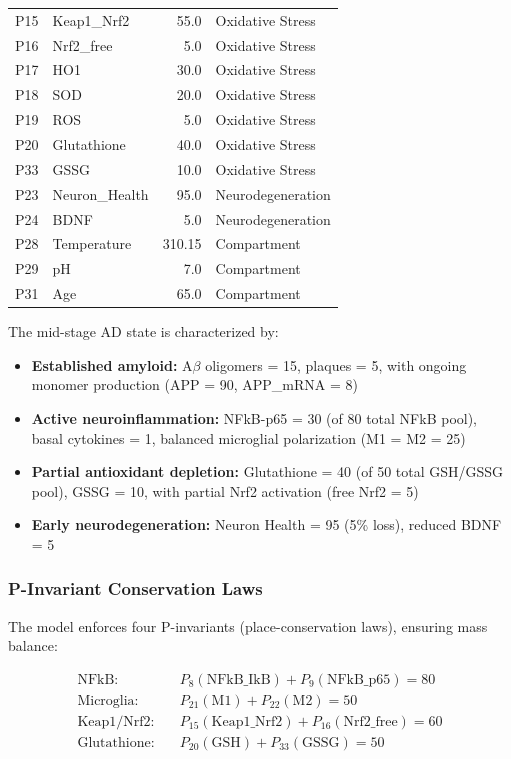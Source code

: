 \documentclass[10pt,letterpaper]{article}
\begin{document}
\begin{table}[htbp]
\begin{tabular}{llrl}
P15 & Keap1\_Nrf2          & 55.0   & Oxidative Stress \\
P16 & Nrf2\_free           & 5.0    & Oxidative Stress \\
P17 & HO1                  & 30.0   & Oxidative Stress \\
P18 & SOD                  & 20.0   & Oxidative Stress \\
P19 & ROS                  & 5.0    & Oxidative Stress \\
P20 & Glutathione          & 40.0   & Oxidative Stress \\
P33 & GSSG                 & 10.0   & Oxidative Stress \\
P23 & Neuron\_Health       & 95.0   & Neurodegeneration \\
P24 & BDNF                 & 5.0    & Neurodegeneration \\
P28 & Temperature          & 310.15 & Compartment \\
P29 & pH                   & 7.0    & Compartment \\
P31 & Age                  & 65.0   & Compartment \\
\bottomrule
\end{tabular}
\end{table}

The mid-stage AD state is characterized by:
\begin{itemize}
\item \textbf{Established amyloid:} A$\beta$ oligomers = 15, plaques = 5, with ongoing monomer production (APP = 90, APP\_mRNA = 8)
\item \textbf{Active neuroinflammation:} NFkB-p65 = 30 (of 80 total NFkB pool), basal cytokines = 1, balanced microglial polarization (M1 = M2 = 25)
\item \textbf{Partial antioxidant depletion:} Glutathione = 40 (of 50 total GSH/GSSG pool), GSSG = 10, with partial Nrf2 activation (free Nrf2 = 5)
\item \textbf{Early neurodegeneration:} Neuron Health = 95 (5\% loss), reduced BDNF = 5
\end{itemize}

\subsubsection{P-Invariant Conservation Laws}

The model enforces four P-invariants (place-conservation laws), ensuring mass balance:

\begin{align}
\text{NFkB:} \quad &P_8 (\text{NFkB\_IkB}) + P_9 (\text{NFkB\_p65}) = 80 \label{eq:inv_nfkb} \\
\text{Microglia:} \quad &P_{21} (\text{M1}) + P_{22} (\text{M2}) = 50 \label{eq:inv_micro} \\
\text{Keap1/Nrf2:} \quad &P_{15} (\text{Keap1\_Nrf2}) + P_{16} (\text{Nrf2\_free}) = 60 \label{eq:inv_nrf2} \\
\text{Glutathione:} \quad &P_{20} (\text{GSH}) + P_{33} (\text{GSSG}) = 50 \label{eq:inv_gsh}
\end{align}
\end{document}
